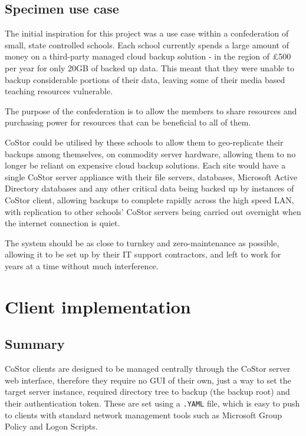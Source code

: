 \documentclass[bsc,frontabs,twoside,singlespacing,parskip,deptreport]{infthesis}     %
\begin{document}

\section{Specimen use case}

The initial inspiration for this project was a use case within a confederation of small, state
controlled schools. Each school currently spends a large amount of money on a third-party 
managed cloud backup solution - in the region of \pounds500 per year for only 20GB of backed
up data. This meant that they were unable to backup considerable portions of their data, leaving
some of their media based teaching resources vulnerable.

The purpose of the confederation is to allow the members to share resources and purchasing power
for resources that can be beneficial to all of them.

CoStor could be utilised by these schools to allow them to geo-replicate their backups among 
themselves, on commodity server hardware, allowing them to no longer be reliant on expensive
cloud backup solutions. Each site would have a single CoStor server appliance with their file
servers, databases, Microsoft Active Directory databases and any other critical data being
backed up by instances of CoStor client, allowing backups to complete rapidly across the high
speed LAN, with replication to other schools' CoStor servers being carried out overnight when 
the internet connection is quiet.

The system should be as close to turnkey and zero-maintenance as possible, allowing it to be
set up by their IT support contractors, and left to work for years at a time without much
interference.

\chapter{Client implementation}

\section{Summary}

CoStor clients are designed to be managed centrally through the CoStor server web interface,
therefore they require no GUI of their own, just a way to set the target server instance, 
required directory tree to backup (the backup root) and their authentication token. These are
set using a \texttt{.YAML} file, which is easy to push to clients with standard network 
management tools such as Microsoft Group Policy and Logon Scripts.
\end{document}
